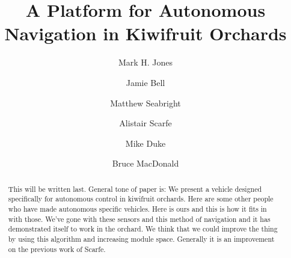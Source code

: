 \documentclass[preprint,authoryear,12pt]{elsarticle}
\begin{document}
\begin{frontmatter}



\title{A Platform for Autonomous Navigation in Kiwifruit Orchards}



\author[UoW]{Mark H. Jones} 

\author[UoA]{Jamie Bell}
\author[UoW]{Matthew Seabright}
\author[RPL]{Alistair Scarfe}
\author[UoW]{Mike Duke}
\author[UoA]{Bruce MacDonald}

\address[UoW]{School of Engineering, University of Waikato, Hamilton, New Zealand}
\address[UoA]{Faculty of Engineering, University of Auckland, Auckland, New Zealand}
\address[RPL]{Robotics Plus Ltd, Newnham Innovation Park, Tauranga, New Zealand}

\begin{abstract}

    This will be written last.
    General tone of paper is:
    We present a vehicle designed specifically for autonomous control in kiwifruit orchards.
    Here are some other people who have made autonomous specific vehicles.
    Here is ours and this is how it fits in with those.
    We've gone with these sensors and this method of navigation and it has demonstrated itself to work in the orchard.
    We think that we could improve the thing by using this algorithm and increasing module space.
    Generally it is an improvement on the previous work of Scarfe.
\end{abstract}


\end{frontmatter}
\end{document}
